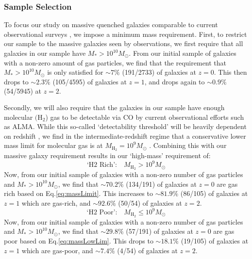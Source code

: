 \documentclass[twocolumn, linenumbers]{aastex631}
\newcommand{\hh}{\text{H}_2}
\newcommand{\mhh}{M_{\text{H}_2}}
\newcommand{\eq}{Eq.\hspace{.2em}}
\newcommand{\red}[1]{{\color{red} #1}} %
\begin{document}
\subsubsection{Sample Selection}
\label{ssec:massLimit}
To focus our study on massive quenched galaxies comparable to current observational surveys \citep[e.g.][]{rowlands, french_2015, french_2017, French_2018, suessSquiggle, Bezanson_2022, Baron2023, french23, Spilker2025}, we impose a minimum mass requirement.  First, to restrict our sample to the massive galaxies seen by observations, we first require that all galaxies in our sample have $M_*>10^{10}M_\odot$.  \red{From our initial sample of galaxies with a non-zero amount of gas particles, we find that the requirement that $M_*>10^{10}M_\odot$ is only satisfied for $\sim 7\%$ (191/2733) of galaxies at $z=0$.  This then drops to $\sim 2.3\%$ (105/4595) of galaxies at $z=1$, and drops again to $\sim 0.9\%$ (54/5945) at $z=2$.}

Secondly, we will also require that the galaxies in our sample have enough molecular $(\hh$) gas to be detectable via CO by current observational efforts such as ALMA.  While this so-called `detectability threshold' will be heavily dependent on redshift \citep{Bezanson_2022, Baron2023}, we find in the intermediate-redshift regime that a conservative lower mass limit for molecular gas is at $\mhh=10^9M_\odot$ \citep{suess_2017, suessSquiggle}.  Combining this with our massive galaxy requirement results in our `high-mass' requirement of:
\begin{equation}
    \text{`H2 Rich':}\quad \mhh>10^9M_\odot
    \label{eq:massLimit}
\end{equation}
\red{Now, from our initial sample of galaxies with a non-zero number of gas particles and $M_*>10^{10}M_\odot$, we find that $\sim 70.2\%$ (134/191) of galaxies at $z=0$ are gas rich based on \eq\ref{eq:massLimit}.  This increases to $\sim 81.9\%$ (86/105) of galaxies at $z=1$ which are gas-rich, and $\sim 92.6\%$ (50/54) of galaxies at $z=2.$}
\begin{equation}
    \text{`H2 Poor':}\quad \mhh\leq 10^9M_\odot
    \label{eq:massLowLim}
\end{equation}
\red{Now, from our initial sample of galaxies with a non-zero number of gas particles and $M_*>10^{10}M_\odot$, we find that $\sim 29.8\%$ (57/191) of galaxies at $z=0$ are gas poor based on \eq\ref{eq:massLowLim}.  This drops to $\sim 18.1\%$ (19/105) of galaxies at $z=1$ which are gas-poor, and $\sim 7.4\%$ (4/54) of galaxies at $z=2.$}
\end{document}
